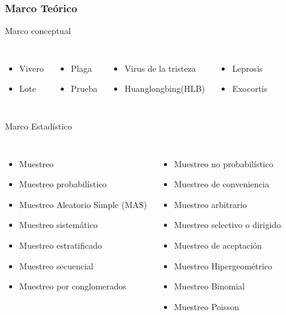 \documentclass[10.5pt]{beamer}
\begin{document}
\begin{frame}
\frametitle{Marco Teórico}
\begin{block}{Marco conceptual}
\begin{columns}
\begin{itemize}
\item Vivero
\item Lote
\end{itemize}
\begin{itemize}
\item Plaga
\item Prueba
\end{itemize}
\begin{itemize}
\item Virus de la tristeza
\item Huanglongbing(HLB)
\end{itemize}
\begin{itemize}
\item Leprosis
\item Exocortis
\end{itemize}
\end{columns}
\end{block}
\begin{block}{Marco Estadístico}
\begin{columns}
\begin{itemize}
\item Muestreo
\item Muestreo probabilístico
\item Muestreo Aleatorio Simple (MAS)
\item Muestreo sistemático
\item Muestreo estratificado
\item Muestreo secuencial
\item Muestreo por conglomerados
\end{itemize}
\begin{itemize}
\item Muestreo no probabilístico
\item Muestreo de conveniencia
\item Muestreo arbitrario
\item Muestreo selectivo o dirigido
\item Muestreo de aceptación
\item Muestreo Hipergeométrico
\item Muestreo Binomial
\item Muestreo Poisson
\end{itemize}
\end{columns}
\end{block}
\end{frame}
\end{document}
